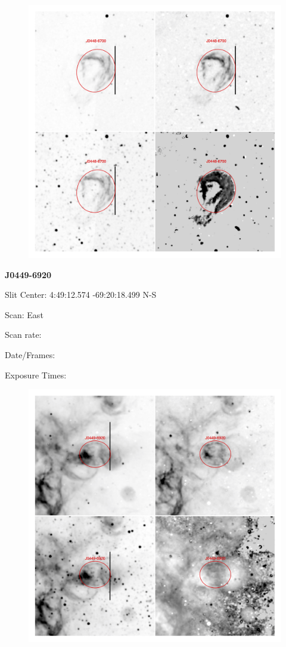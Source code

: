 \documentclass[11pt]{article}
\begin{document}
\begin{figure}
\includegraphics[width=11.cm]{snapshots/J0448-6700.png}
\end{figure}

\newpage
{\bf J0449-6920}

Slit Center:   4:49:12.574     -69:20:18.499     N-S

Scan:  East

Scan rate:  

Date/Frames:

Exposure Times:  

\begin{figure}
\includegraphics[width=11.cm]{snapshots/J0449-6920.png}
\end{figure}
\end{document}

